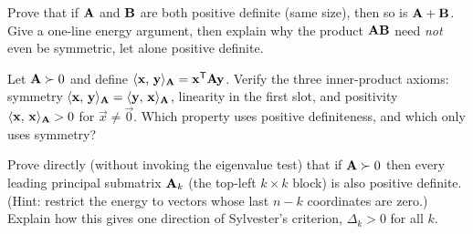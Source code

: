 \begin{exercise}
\label{ch27:ex-sum}
Prove that if $\mathbf{A}$ and $\mathbf{B}$ are both positive definite (same size), then so is
$\mathbf{A}+\mathbf{B}$. Give a one-line energy argument, then explain why the product $\mathbf{A}\mathbf{B}$
need \emph{not} even be symmetric, let alone positive definite.
\end{exercise}

\begin{exercise}
\label{ch27:ex-innerproduct}
Let $\mathbf{A}\succ0$ and define $\langle \mathbf{x},\, \mathbf{y} \rangle_{\mathbf{A}} = \mathbf{x}^{\mathsf{T}}\mathbf{A}\mathbf{y}$.
Verify the three inner-product axioms: symmetry $\langle \mathbf{x},\, \mathbf{y} \rangle_{\mathbf{A}} =
\langle \mathbf{y},\, \mathbf{x} \rangle_{\mathbf{A}}$, linearity in the first slot, and positivity
$\langle \mathbf{x},\, \mathbf{x} \rangle_{\mathbf{A}} > 0$ for $\vec{x}\neq\vec{0}$. Which property uses positive
definiteness, and which only uses symmetry?
\end{exercise}

\begin{exercise}
\label{ch27:ex-challenge}
Prove directly (without invoking the eigenvalue test) that if $\mathbf{A}\succ0$ then every leading
principal submatrix $\mathbf{A}_k$ (the top-left $k\times k$ block) is also positive definite. (Hint:
restrict the energy to vectors whose last $n-k$ coordinates are zero.) Explain how this gives one
direction of Sylvester's criterion, $\Delta_k>0$ for all $k$.
\end{exercise}
